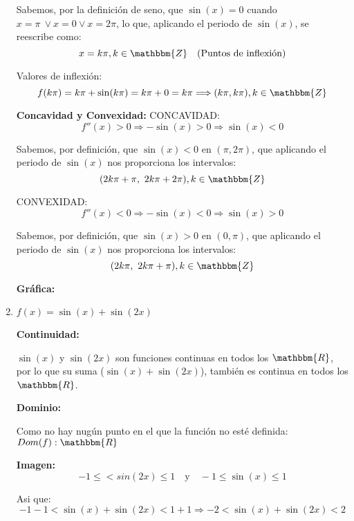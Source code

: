 \documentclass[12pt]{article}
\begin{document}
\begin{enumerate}[\hspace{9px} a)]
        Sabemos, por la definici\'on de seno, que \(\sin(x)=0\) cuando \(x=\pi \ \vee x=0 \vee x=2\pi\), lo que, aplicando el periodo de \(\sin(x)\), se reescribe como:
        \[x=k\pi, k\in\mathbbm{Z} \quad \text{(Puntos de inflexión)}\]

        Valores de inflexi\'on:
        \[f(k\pi)=k\pi+\sin(k\pi)=k\pi+0=k\pi \Longrightarrow (k\pi,k\pi), k\in\mathbbm{Z}\]

    \textbf{Concavidad y Convexidad: }\medskip
        CONCAVIDAD:
        \begin{equation*}
            f''(x)>0 \Longrightarrow -\sin(x)>0 \Longrightarrow \sin(x)<0
        \end{equation*}

        Sabemos, por definici\'on, que \(\sin(x)<0\) en \((\pi,2\pi)\), que aplicando el periodo de \(\sin(x)\) nos proporciona los intervalos:
        \[(2k\pi+\pi, \ 2k\pi+2\pi), k\in\mathbbm{Z}\]

        CONVEXIDAD:
        \begin{equation*}
            f''(x)<0 \Longrightarrow -\sin(x)<0 \Longrightarrow \sin(x)>0
        \end{equation*}

        Sabemos, por definici\'on, que \(\sin(x)>0\) en \((0,\pi)\), que aplicando el periodo de \(\sin(x)\) nos proporciona los intervalos:
        \[(2k\pi, \ 2k\pi+\pi), k\in\mathbbm{Z}\]

    \textbf{Gr\'afica: }

    \item \(f(x)=\sin(x)+\sin(2x)\)\bigskip
    
    \textbf{Continuidad: }\medskip

        \(\sin(x)\) y \(\sin(2x)\) son funciones continuas en todos los \(\mathbbm{R}\), por lo que su suma (\(\sin(x)+\sin(2x)\)), tambi\'en es continua en todos los \(\mathbbm{R}\).\medskip

    \textbf{Dominio: }\medskip

        Como no hay nug\'un punto en el que la funci\'on no est\'e definida: \(Dom(f): \mathbbm{R}\)\medskip

    \textbf{Imagen: }
        \begin{equation*}
            -1\leq<sin(2x)\leq1 \quad \text{y} \quad -1\leq\sin(x)\leq1
        \end{equation*}

        Asi que:
        \begin{equation*}
            -1-1<\sin(x)+\sin(2x)<1+1 \Longrightarrow -2<\sin(x)+\sin(2x)<2
        \end{equation*}


\end{enumerate}
\end{document}
